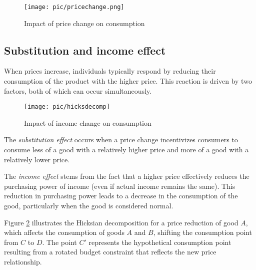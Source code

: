 \begin{figure}
	\centering
	\texttt{[image: pic/pricechange.png]}
	\caption{\label{fig:pricechange} Impact of price change on consumption}
\end{figure}


\subsection{Substitution and income effect}\label{substitution-and-income-effect}

When prices increase, individuals typically respond by reducing their consumption of the product with the higher price. This reaction is driven by two factors, both of which can occur simultaneously.

\begin{figure}
	\centering
	\texttt{[image: pic/hicksdecomp]}
	\caption{\label{fig:hicksdecomp} Impact of income change on consumption}
\end{figure}

The \emph{substitution effect} occurs when a price change incentivizes consumers to consume less of a good with a relatively higher price and more of a good with a relatively lower price.

The \emph{income effect} stems from the fact that a higher price effectively reduces the purchasing power of income (even if actual income remains the same). This reduction in purchasing power leads to a decrease in the consumption of the good, particularly when the good is considered normal.

Figure \ref{fig:hicksdecomp} illustrates the Hicksian decomposition for a price reduction of good \(A\), which affects the consumption of goods \(A\) and \(B\), shifting the consumption point from \(C\) to \(D\). The point \(C'\) represents the hypothetical consumption point resulting from a rotated budget constraint that reflects the new price relationship.


